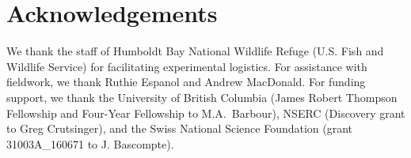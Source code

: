 \documentclass[11pt,]{article}
\begin{document}
\section{Acknowledgements}\label{acknowledgements}

We thank the staff of Humboldt Bay National Wildlife Refuge (U.S. Fish
and Wildlife Service) for facilitating experimental logistics. For
assistance with fieldwork, we thank Ruthie Espanol and Andrew MacDonald.
For funding support, we thank the University of British Columbia (James
Robert Thompson Fellowship and Four-Year Fellowship to M.A.~Barbour),
NSERC (Discovery grant to Greg Crutsinger), and the Swiss National
Science Foundation (grant 31003A\_160671 to J. Bascompte).


\end{document}
